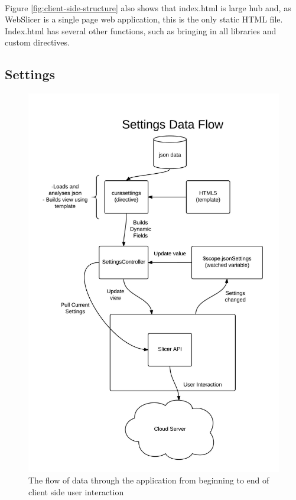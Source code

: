 \paragraph{}
Figure \ref{fig:client-side-structure} also shows that index.html is large hub and, as WebSlicer is a single page web application, this is the only static HTML file.
Index.html has several other functions, such as bringing in all libraries and custom directives.

\subsection{Settings}%
\begin{figure}[!ht]
  \centering
  \includegraphics[width=\linewidth]{diagrams/Settings-Data-Flow}
  \caption{The flow of data through the application from beginning to end of client side user interaction}
  \label{fig:settings-data-flow}
\end{figure}
